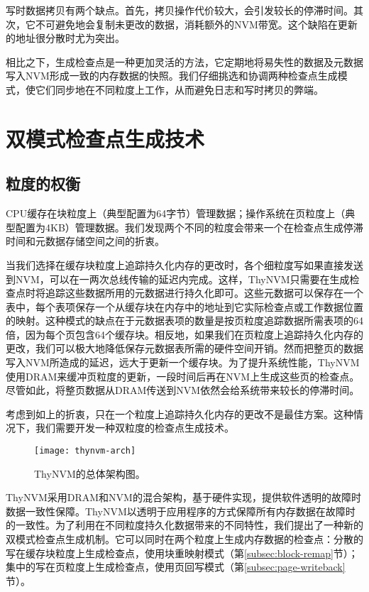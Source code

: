 写时数据拷贝有两个缺点。首先，拷贝操作代价较大，会引发较长的停滞时间。其次，它不可避免地会复制未更改的数据，消耗额外的NVM带宽。这个缺陷在更新的地址很分散时尤为突出。

相比之下，生成检查点是一种更加灵活的方法，它定期地将易失性的数据及元数据写入NVM形成一致的内存数据的快照。我们仔细挑选和协调两种检查点生成模式，使它们同步地在不同粒度上工作，从而避免日志和写时拷贝的弊端。


\section{双模式检查点生成技术}

\subsection{粒度的权衡}

CPU缓存在块粒度上（典型配置为64字节）管理数据；操作系统在页粒度上（典型配置为4KB）管理数据。我们发现两个不同的粒度会带来一个在检查点生成停滞时间和元数据存储空间之间的折衷。

当我们选择在缓存块粒度上追踪持久化内存的更改时，各个细粒度写如果直接发送到NVM，可以在一两次总线传输的延迟内完成。这样，ThyNVM只需要在生成检查点时将追踪这些数据所用的元数据进行持久化即可。这些元数据可以保存在一个表中，每个表项保存一个从缓存块在内存中的地址到它实际检查点或工作数据位置的映射。这种模式的缺点在于元数据表项的数量是按页粒度追踪数据所需表项的64倍，因为每个页包含64个缓存块。相反地，如果我们在页粒度上追踪持久化内存的更改，我们可以极大地降低保存元数据表所需的硬件空间开销。然而把整页的数据写入NVM所造成的延迟，远大于更新一个缓存块。为了提升系统性能，ThyNVM使用DRAM来缓冲页粒度的更新，一段时间后再在NVM上生成这些页的检查点。尽管如此，将整页数据从DRAM传送到NVM依然会给系统带来较长的停滞时间。

考虑到如上的折衷，只在一个粒度上追踪持久化内存的更改不是最佳方案。这种情况下，我们需要开发一种双粒度的检查点生成技术。

\begin{figure}[!h]
\centering
\texttt{[image: thynvm-arch]}
\caption{ThyNVM的总体架构图。}
\label{fig:thynvm-arch}
\end{figure}

ThyNVM采用DRAM和NVM的混合架构，基于硬件实现，提供软件透明的故障时数据一致性保障。ThyNVM以透明于应用程序的方式保障所有内存数据在故障时的一致性。为了利用在不同粒度持久化数据带来的不同特性，我们提出了一种新的双模式检查点生成机制。它可以同时在两个粒度上生成内存数据的检查点：分散的写在缓存块粒度上生成检查点，使用块重映射模式（第\ref{subsec:block-remap}节）；集中的写在页粒度上生成检查点，使用页回写模式（第\ref{subsec:page-writeback}节）。

